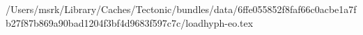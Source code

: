 /Users/msrk/Library/Caches/Tectonic/bundles/data/6ffe055852f8faf66c0acbe1a7fb27f87b869a90bad1204f3bf4d9683f597c7c/loadhyph-eo.tex